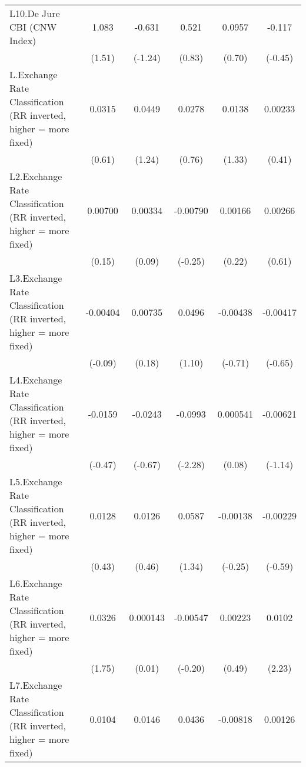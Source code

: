 {\begin{longtable}{l*{5}{c}}
\addlinespace
L10.De Jure CBI (CNW Index)&    1.083         &   -0.631         &    0.521         &   0.0957         &   -0.117         \\
                &   (1.51)         &  (-1.24)         &   (0.83)         &   (0.70)         &  (-0.45)         \\
\addlinespace
L.Exchange Rate Classification (RR inverted, higher = more fixed)&   0.0315         &   0.0449         &   0.0278         &   0.0138         &  0.00233         \\
                &   (0.61)         &   (1.24)         &   (0.76)         &   (1.33)         &   (0.41)         \\
\addlinespace
L2.Exchange Rate Classification (RR inverted, higher = more fixed)&  0.00700         &  0.00334         & -0.00790         &  0.00166         &  0.00266         \\
                &   (0.15)         &   (0.09)         &  (-0.25)         &   (0.22)         &   (0.61)         \\
\addlinespace
L3.Exchange Rate Classification (RR inverted, higher = more fixed)& -0.00404         &  0.00735         &   0.0496         & -0.00438         & -0.00417         \\
                &  (-0.09)         &   (0.18)         &   (1.10)         &  (-0.71)         &  (-0.65)         \\
\addlinespace
L4.Exchange Rate Classification (RR inverted, higher = more fixed)&  -0.0159         &  -0.0243         &  -0.0993\sym{*}  & 0.000541         & -0.00621         \\
                &  (-0.47)         &  (-0.67)         &  (-2.28)         &   (0.08)         &  (-1.14)         \\
\addlinespace
L5.Exchange Rate Classification (RR inverted, higher = more fixed)&   0.0128         &   0.0126         &   0.0587         & -0.00138         & -0.00229         \\
                &   (0.43)         &   (0.46)         &   (1.34)         &  (-0.25)         &  (-0.59)         \\
\addlinespace
L6.Exchange Rate Classification (RR inverted, higher = more fixed)&   0.0326         & 0.000143         & -0.00547         &  0.00223         &   0.0102\sym{*}  \\
                &   (1.75)         &   (0.01)         &  (-0.20)         &   (0.49)         &   (2.23)         \\
\addlinespace
L7.Exchange Rate Classification (RR inverted, higher = more fixed)&   0.0104         &   0.0146         &   0.0436\sym{*}  & -0.00818         &  0.00126         \\

\end{longtable}}
